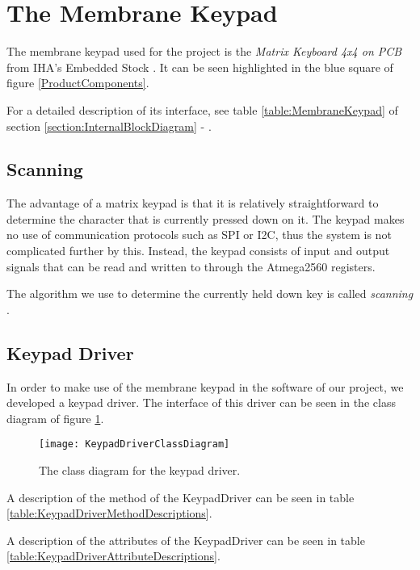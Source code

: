 \section{The Membrane Keypad}
\label{section:MatrixKeyboard}

The membrane keypad used for the project is the \textit{Matrix Keyboard 4x4 on PCB} from IHA's Embedded Stock \cite{MatrixKeyboard}. It can be seen highlighted in the blue square of figure \ref{ProductComponents}.

For a detailed description of its interface, see table \ref{table:MembraneKeypad} of section \ref{section:InternalBlockDiagram} - .

\subsection{Scanning}
The advantage of a matrix keypad is that it is relatively straightforward to determine the character that is currently pressed down on it. The keypad makes no use of communication protocols such as SPI or I2C, thus the system is not complicated further by this. Instead, the keypad consists of input and output signals that can be read and written to through the Atmega2560 registers.

The algorithm we use to determine the currently held down key is called \textit{scanning} \cite{KeypadScanningAlgorithm}. 

\subsection{Keypad Driver}
In order to make use of the membrane keypad in the software of our project, we developed a keypad driver. The interface of this driver can be seen in the class diagram of figure \ref{KeypadDriverClassDiagram}.

\begin{figure}[H]
	\texttt{[image: KeypadDriverClassDiagram]}
	\centering
	\caption{The class diagram for the keypad driver.}
	\label{KeypadDriverClassDiagram}
\end{figure}

A description of the method of the KeypadDriver can be seen in table \ref{table:KeypadDriverMethodDescriptions}.

A description of the attributes of the KeypadDriver can be seen in table \ref{table:KeypadDriverAttributeDescriptions}.

